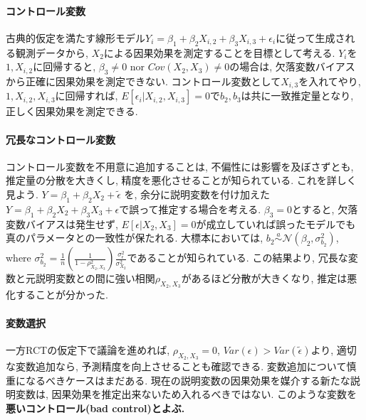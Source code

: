 \documentclass[paper=a4paper,fontsize=10pt]{jlreq}
\begin{document}
\paragraph{コントロール変数}
古典的仮定を満たす線形モデル$Y_i=\beta_1+\beta_2X_{i,2}+\beta_3X_{i,3}+\epsilon_i$に従って生成される観測データから, $X_2$による因果効果を測定することを目標として考える. $Y_i$を$1, X_{i,2}$に回帰すると, $\beta_3 \neq 0 \text{ nor } Cov(X_2, X_{3})\neq 0$の場合は, 欠落変数バイアスから正確に因果効果を測定できない. コントロール変数として$X_{i,3}$を入れてやり, $1, X_{i,2}, X_{i,3}$に回帰すれば, $E[\epsilon_i | X_{i,2}, X_{i,3}]=0$で$b_2, b_3$は共に一致推定量となり, 正しく因果効果を測定できる.\\

\paragraph{冗長なコントロール変数}
コントロール変数を不用意に追加することは, 不偏性には影響を及ぼさずとも, 推定量の分散を大きくし, 精度を悪化させることが知られている. これを詳しく見よう. $Y=\beta_1+\beta_2X_{2}+\tilde{\epsilon}$ を, 余分に説明変数を付け加えた$Y=\beta_1+\beta_2X_{2}+\beta_3X_{3}+\epsilon$で誤って推定する場合を考える. $\beta_3=0$とすると, 欠落変数バイアスは発生せず, ${E}[\epsilon | X_{2}, X_{3}]=0$が成立していれば誤ったモデルでも真のパラメータとの一致性が保たれる. 大標本においては, $b_2 \overset{a}{\sim} \mathcal{N}(\beta_2, \sigma_{b_2}^2)$, where $\sigma_{b_2}^2=\frac{1}{n}(\frac{1}{1-\rho_{X_{2}, X_{3}}^2})\frac{\sigma_\epsilon^2}{\sigma_{X_{2}}^2}$であることが知られている. この結果より, 冗長な変数と元説明変数との間に強い相関$\rho_{X_{2}, X_{3}}$があるほど分散が大きくなり, 推定は悪化することが分かった.\\

\paragraph{変数選択}
一方RCTの仮定下で議論を進めれば, $\rho_{X_{2}, X_{3}}=0$, $Var({\epsilon})>Var(\tilde{{\epsilon}})$より, 適切な変数追加なら, 予測精度を向上させることも確認できる. 変数追加について慎重になるべきケースはまだある. 現在の説明変数の因果効果を媒介する新たな説明変数は, 因果効果を推定出来ないため入れるべきではない. このような変数を\rmfamily\mcfamily\bfseries{悪いコントロール(bad control)}\mdseries とよぶ.\\
\end{document}
